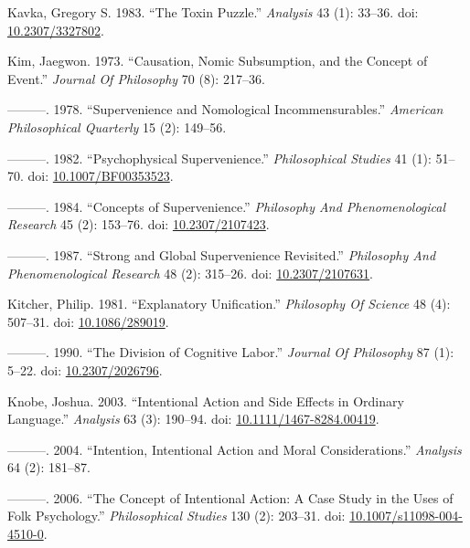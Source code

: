 \documentclass[
  10pt,
  letterpaper,
  DIV=11,
  numbers=noendperiod,
  twoside]{scrartcl}
\newlength{\cslhangindent}
\newenvironment{CSLReferences}[2] %
 {\begin{list}{}{%
  \setlength{\itemindent}{0pt}
  \setlength{\leftmargin}{0pt}
  \setlength{\parsep}{0pt}
  \ifodd #1
   \setlength{\leftmargin}{\cslhangindent}
   \setlength{\itemindent}{-1\cslhangindent}
  \fi
  \setlength{\itemsep}{#2\baselineskip}}}
 {\end{list}}
\begin{document}
\begin{CSLReferences}{1}{0}
Kavka, Gregory S. 1983. {``The Toxin Puzzle.''} \emph{Analysis} 43 (1):
33--36. doi: \href{https://doi.org/10.2307/3327802}{10.2307/3327802}.

Kim, Jaegwon. 1973. {``Causation, Nomic Subsumption, and the Concept of
Event.''} \emph{Journal Of Philosophy} 70 (8): 217--36.

---------. 1978. {``Supervenience and Nomological Incommensurables.''}
\emph{American Philosophical Quarterly} 15 (2): 149--56.

---------. 1982. {``Psychophysical Supervenience.''} \emph{Philosophical
Studies} 41 (1): 51--70. doi:
\href{https://doi.org/10.1007/BF00353523}{10.1007/BF00353523}.

---------. 1984. {``Concepts of Supervenience.''} \emph{Philosophy And
Phenomenological Research} 45 (2): 153--76. doi:
\href{https://doi.org/10.2307/2107423}{10.2307/2107423}.

---------. 1987. {``Strong and Global Supervenience Revisited.''}
\emph{Philosophy And Phenomenological Research} 48 (2): 315--26. doi:
\href{https://doi.org/10.2307/2107631}{10.2307/2107631}.

Kitcher, Philip. 1981. {``Explanatory Unification.''} \emph{Philosophy
Of Science} 48 (4): 507--31. doi:
\href{https://doi.org/10.1086/289019}{10.1086/289019}.

---------. 1990. {``The Division of Cognitive Labor.''} \emph{Journal Of
Philosophy} 87 (1): 5--22. doi:
\href{https://doi.org/10.2307/2026796}{10.2307/2026796}.

Knobe, Joshua. 2003. {``Intentional Action and Side Effects in Ordinary
Language.''} \emph{Analysis} 63 (3): 190--94. doi:
\href{https://doi.org/10.1111/1467-8284.00419}{10.1111/1467-8284.00419}.

---------. 2004. {``Intention, Intentional Action and Moral
Considerations.''} \emph{Analysis} 64 (2): 181--87.

---------. 2006. {``The Concept of Intentional Action: A Case Study in
the Uses of Folk Psychology.''} \emph{Philosophical Studies} 130 (2):
203--31. doi:
\href{https://doi.org/10.1007/s11098-004-4510-0}{10.1007/s11098-004-4510-0}.


\end{CSLReferences}
\end{document}

